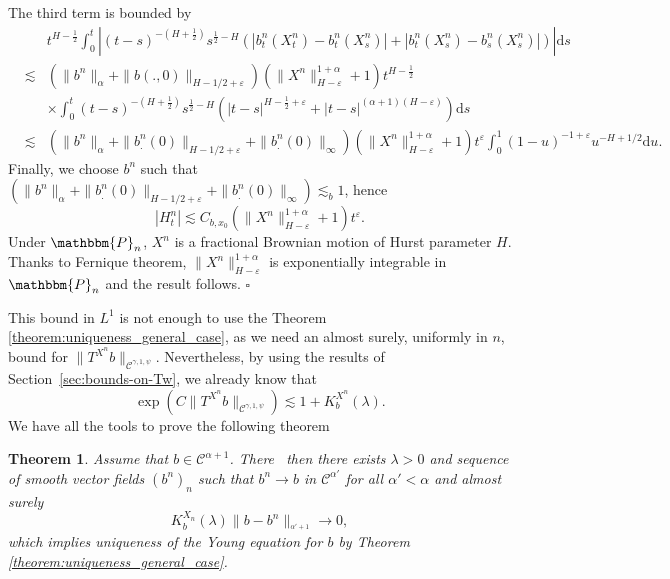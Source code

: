 \documentclass[a4paper,11pt]{article}
\newcommand{\mathd}{\mathrm{d}}
\newtheorem{theorem}{Theorem}[section]
\newenvironment{proof}{{\sc Proof.}}{\hfill$\square$}
\newcommand{\CC}{\mathscr C}
\begin{document}
\begin{proof}
  
  The third term is bounded by
  \begin{eqnarray*}
    &  & t^{H- \frac{1}{2}}  \int_{0}^{t} \left\lvert (t-s)^{-(H+ \frac{1}{2} )}
    s^{\frac{1}{2} -H}  ( | b^{n}_{t} (X_{t}^{n} )-b^{n}_{t} ( X_{s}^{n} ) | +
    | b^{n}_{t} ( X_{s}^{n} ) -b^{n}_{s} (X_{s}^{n} ) | ) \right\lvert \mathd s\\
    & \lesssim & ( \| b^{n} \|_{\alpha} + \| b ( .,0 ) \|_{H-1/2+
    \varepsilon} ) ( \|X^{n} \|^{1+ \alpha}_{H- \varepsilon} +1 ) t^{H-
    \frac{1}{2}}   \\ & & \times \int_{0}^{t} (t-s)^{- (H+ \frac{1}{2} )} s^{\frac{1}{2} -H} 
    \left( |t-s|^{H- \frac{1}{2} + \varepsilon} +|t-s|^{( \alpha +1)(H-
    \varepsilon )} \right) \mathd s\\
    & \lesssim & ( \| b^{n} \|_{\alpha} + \| b^{n}_{.} ( 0 ) \|_{H-1/2+
    \varepsilon} + \| b^{n}_{.} ( 0 ) \|_{\infty} ) ( \|X^{n} \|^{1+
    \alpha}_{H- \varepsilon} +1 ) t^{\varepsilon} \int_{0}^{1} ( 1-u )^{-1+
    \varepsilon} u^{-H+1/2} \mathd u .
  \end{eqnarray*}
  Finally, we choose $b^{n}$ such that $( \| b^{n} \|_{\alpha} + \| b^{n}_{.}
  ( 0 ) \|_{H-1/2+ \varepsilon} + \| b^{n}_{.} ( 0 ) \|_{\infty} )
  \lesssim_{b} 1$, hence
  \[ | H_{t}^{n} | \lesssim C_{b,x_{0}} ( \|X^{n} \|^{1+ \alpha}_{H-
     \varepsilon} +1 ) t^{\varepsilon}. \]
  Under $\mathbbm{P}_{n}$, $X^{n}$ is a fractional Brownian motion of
  Hurst parameter $H$. Thanks to Fernique theorem, $\|X^{n} \|^{1+ \alpha}_{H-
  \varepsilon}$ is exponentially integrable in $\mathbbm{P}_{n}$ and the
  result follows.
\end{proof}


This bound in $L^{1}$ is not enough to use the Theorem
\ref{theorem:uniqueness_general_case}, as we need an almost surely, uniformly
in $n$, bound for $\| T^{X^{n}} b \|_{\CC^{\gamma ,1, \psi}}$. Nevertheless, by
using the results of Section~\ref{sec:bounds-on-Tw}, we
already know that
\[ \exp \left( C \| T^{X^{n}} b \|_{\CC^{\gamma ,1, \psi}} \right) \lesssim
   1+K^{X^{n}}_{b} ( \lambda ). \]
We have all the tools to prove the following theorem

\begin{theorem}
  Assume that $b \in \CC^{\alpha +1}$. There \ then there exists $\lambda >0$
  and sequence of smooth vector fields $(b^{n} )_{n}$ such that $b^{n} \to b$
  in $\CC^{\alpha'}$ for all $\alpha' < \alpha$ and almost surely
  \[ K_{b}^{X_{n}} ( \lambda )  \|b-b^{n} \|_{^{\alpha' +1}} \to 0, \]
  which implies uniqueness of the Young equation for $b$ by Theorem
  \ref{theorem:uniqueness_general_case}.
\end{theorem}
\end{document}
